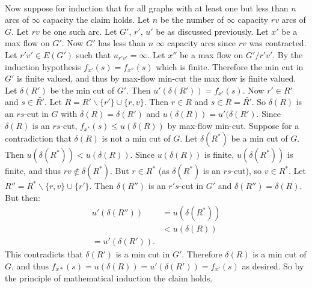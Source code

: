 \documentclass[letterpaper,12pt,oneside,onecolumn]{article}
\begin{document}
\paragraph{}
Now suppose for induction that for all graphs with at least one but less than $n$ arcs of $\infty$ capacity the claim holds. Let $n$ be the number of $\infty$ capacity $rv$ arcs of $G$. Let $rv$ be one such arc. Let $G'$, $r'$, $u'$ be as discussed previously. Let $x'$ be a max flow on $G'$. Now $G'$ has less than $n$ $\infty$ capacity arcs since $rv$ was contracted. Let $r'v' \in E(G')$ such that $u_{r'v'} = \infty$. Let $x''$ be a max flow on $G'/r'v'$. By the induction hypothesis $f_{x'}(s) = f_{x''}(s)$ which is finite. Therefore the min cut in $G'$ is finite valued, and thus by max-flow min-cut the max flow is finite valued. Let $\delta(R')$ be the min cut of $G'$. Then $u'(\delta(R')) = f_{x'}(s)$. Now $r' \in R'$ and $s \in \bar{R'}$. Let $R = R' \backslash\{r'\} \cup \{r,v\}$. Then $r \in R$ and $s \in \bar{R} = \bar{R'}$. So $\delta(R)$ is an $rs$-cut in $G$ with $\delta(R) = \delta(R')$ and $u(\delta(R)) = u'(\delta(R')$. Since $\delta(R)$ is an $rs$-cut, $f_{x^*}(s) \leq u(\delta(R))$ by max-flow min-cut. Suppose for a contradiction that $\delta(R)$ is not a min cut of $G$. Let $\delta(R^*)$ be a min cut of $G$. Then $u(\delta(R^*)) < u(\delta(R))$. Since $u(\delta(R))$ is finite, $u(\delta(R^*))$ is finite, and thus $rv \not\in \delta(R^*)$. But $r \in R^*$ (as $\delta(R^*)$ is an $rs$-cut), so $v \in R^*$. Let $R'' = R^* \backslash \{r,v\} \cup \{r'\}$. Then $\delta(R'')$ is an $r's$-cut in $G'$ and $\delta(R'') = \delta(R)$. But then:
\begin{align*}
u'(\delta(R'')) &= u(\delta(R^*)) \\
&< u(\delta(R)) \\
= u'(\delta(R')).
\end{align*}
This contradicts that $\delta(R')$ is a min cut in $G'$. Therefore $\delta(R)$ is a min cut of $G$, and thus $f_{x*}(s) = u(\delta(R)) = u'(\delta(R')) = f_{x'}(s)$ as desired. So by the principle of mathematical induction the claim holds.
\end{document}

